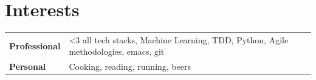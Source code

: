 \documentclass[]{friggeri-cv} %
\begin{document}

%


\section{Interests}


\begin{tabular}{p{3cm}p{10.8cm}}
\textbf{Professional} & <3 all tech stacks, Machine Learning, TDD, Python, Agile methodologies, emacs, git
\vspace{\parsep}
\\
\textbf{Personal} & Cooking, reading, running, beers
\vspace{\parsep}
\\
\end{tabular}

\end{document}
